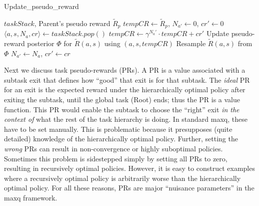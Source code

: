 {\footnotesize \begin{algorithm}[t]
\caption{{\sc Update\_pseudo\_reward}}\label{alg:pr}
\begin{algorithmic}[1]
\REQUIRE $taskStack$, Parent's pseudo reward $\tilde{R}_p$
\STATE $ tempCR \leftarrow \tilde{R}_p$, $N_{a'} \leftarrow 0$, $cr' \leftarrow 0$
\STATE $\langle a, s, N_a, cr \rangle \leftarrow taskStack.pop()$
\STATE $ tempCR \leftarrow \gamma^{N_a'}\cdot tempCR+cr'$
\STATE Update pseudo-reward posterior $\Phi$ for $\tilde{R}(a, s)$ using $(a, s, tempCR)$
\STATE Resample $\tilde{R}(a, s)$ from $\Phi$
\STATE $N_{a'} \leftarrow N_a$, $cr' \leftarrow cr$
\ENDWHILE
\end{algorithmic}
\end{algorithm}
}



Next we discuss task pseudo-rewards (PRs). A PR is a
value associated with a subtask exit that defines how ``good'' that
exit is for that subtask. The {\em ideal} PR for an exit is
the expected reward under the hierarchically optimal policy after
exiting the subtask, until the global task (Root) ends; thus the
PR is a value function.  This PR would
enable the subtask to choose the ``right'' exit {\em in the context
  of} what the rest of the task hierarchy is doing. In standard {\sc
  maxq}, these have to be set manually. This is problematic because it
presupposes (quite detailed) knowledge of the hierarchically optimal
policy. Further, setting the {\em wrong} PRs can result in
non-convergence or highly suboptimal policies. Sometimes this problem
is sidestepped simply by setting all PRs to zero, resulting
in recursively optimal policies. However, it is easy to construct
examples where a recursively optimal policy is arbitrarily worse than
the hierarchically optimal policy. For all these reasons,
PRs are major ``nuisance parameters'' in the {\sc maxq}
framework.

